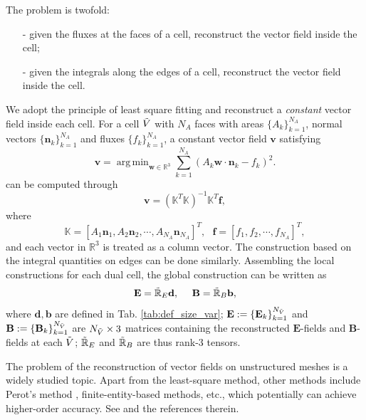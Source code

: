 \documentclass{article}
\DeclareMathOperator*{\argmin}{arg\,min}
\begin{document}
The problem is twofold:
\begin{itemize}
    \item[-] given the fluxes at the faces of a cell, reconstruct the vector field inside the cell;
    \item[-] given the integrals along the edges of a cell, reconstruct the vector field inside the cell. 
\end{itemize}
We adopt the principle of least square fitting and reconstruct a \emph{constant} vector field inside each cell. For a cell $\Tilde{V}$ with $N_A$ faces with areas $\{A_k\}_{k=1}^{N_A}$, normal vectors $\{\mathbf{n}_k\}_{k=1}^{N_A}$ and fluxes $\{f_k\}_{k=1}^{N_A}$, a constant vector field $\mathbf{v}$ satisfying 
\begin{equation*}
    \mathbf{v} = \argmin_{\mathbf{w}\in \mathbb{R}^3} \sum_{k=1}^{N_A}(A_k\mathbf{w} \cdot \mathbf{n}_k - f_k)^2.   
\end{equation*} can be computed through
\begin{equation*}
    \mathbf{v} = (\mathbb{K}^T\mathbb{K})^{-1}\mathbb{K}^T\mathbf{f},
\end{equation*}
where
\begin{equation*}
    \mathbb{K} = [A_1\mathbf{n}_1, A_2\mathbf{n}_2, \cdots, A_{N_A}\mathbf{n}_{N_A}]^T,\ \ \ \mathbf{f} = [f_1, f_2, \cdots, f_{N_A}]^T,
\end{equation*}
and each vector in $\mathbb{R}^3$ is treated as a column vector. The construction based on the integral quantities on edges can be done similarly. Assembling the local constructions for each dual cell, the global construction can be written as 
\begin{equation}
    \mathbf{E} = \Tilde{\mathbb{R}}_E\mathbf{d},
    \ \ \ \ 
    \mathbf{B} = \Tilde{\mathbb{R}}_B\mathbf{b}, \label{equ:reconstruction}
\end{equation}
where $\mathbf{d}, \mathbf{b}$ are defined in Tab. \ref{tab:def_size_var}; $\mathbf{E} := \{\mathbf{E}_k\}_{k=1}^{N_{\Tilde{V}}}$ and $\mathbf{B} := \{\mathbf{B}_k\}_{k=1}^{N_{\Tilde{V}}}$ are $N_{\Tilde{V}} \times 3$ matrices containing the reconstructed $\mathbf{E}$-fields and $\mathbf{B}$-fields at each $\Tilde{V}$; $\Tilde{\mathbb{R}}_E$ and $\Tilde{\mathbb{R}}_B$ are thus rank-3 tensors.

The problem of the reconstruction of vector fields on unstructured meshes is a widely studied topic. Apart from the least-square method, other methods include Perot's method \citep{perot_2000}, finite-entity-based methods, etc., which potentially can achieve higher-order accuracy. See \cite[][Sec. 3.4.4]{fuchs_2021} and the references therein.  
\end{document}
